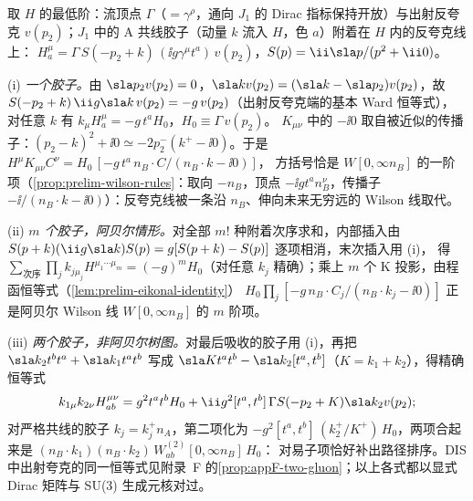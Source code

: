 \begin{example}\label{ex:sudakov-ward-wilson}
取 $H$ 的最低阶：流顶点 $\Gamma$（$=\gamma^\rho$，通向 $J_1$ 的 Dirac 指标保持开放）与出射反夸克 $v(p_2)$；$J_1$ 中的 A 共线胶子（动量 $k$ 流入 $H$，色 $a$）附着在 $H$ 内的反夸克线上：
$H^\mu_a=\Gamma\,S(-p_2+k)\,(\ii g\gamma^\mu t^a)\,v(p_2)$，$S(p)=\ii\sla p/(p^2+\ii0)$。

(i) \emph{一个胶子。}由 $\sla p_2v(p_2)=0$，$\sla kv(p_2)=(\sla k-\sla p_2)v(p_2)$，故 $S(-p_2+k)\,\ii g\sla k\,v(p_2)=-g\,v(p_2)$（出射反夸克端的基本 Ward 恒等式），
对任意 $k$ 有 $k_\mu H^\mu_a=-g\,t^aH_0$，$H_0\equiv\Gamma\,v(p_2)$。%
$K_{\mu\nu}$ 中的 $-\ii0$ 取自被近似的传播子：$(p_2-k)^2+\ii0\simeq-2p_2^-(k^+-\ii0)$。于是 $H^\mu K_{\mu\nu}C^\nu=H_0\,[-g\,t^a\,n_B\!\cdot\!C/(n_B\cdot k-\ii0)]$，
方括号恰是 $W[0,\infty n_B]$ 的一阶项（\cref{prop:prelim-wilson-rules}：取向 $-n_B$，顶点 $-\ii gt^an_B^\nu$，传播子 $-\ii/(n_B\cdot k-\ii0)$）：反夸克线被一条沿 $n_B$、伸向未来无穷远的 Wilson 线取代。

(ii) \emph{$m$ 个胶子，阿贝尔情形。}对全部 $m!$ 种附着次序求和，内部插入由 $S(p+k)(\ii g\sla k)S(p)=g[S(p+k)-S(p)]$ 逐项相消，末次插入用 (i)，
得 $\sum_{\text{次序}}\prod_jk_{j\mu_j}H^{\mu_1\cdots\mu_m}=(-g)^mH_0$（对任意 $k_j$ 精确）；乘上 $m$ 个 K 投影，由程函恒等式（\cref{lem:prelim-eikonal-identity}）
$H_0\prod_j[-g\,n_B\cdot C_j/(n_B\cdot k_j-\ii0)]$ 正是阿贝尔 Wilson 线 $W[0,\infty n_B]$ 的 $m$ 阶项。

(iii) \emph{两个胶子，非阿贝尔树图。}对最后吸收的胶子用 (i)，再把 $\sla k_2t^bt^a+\sla k_1t^at^b$ 写成 $\sla Kt^at^b-\sla k_2[t^a,t^b]$（$K=k_1+k_2$），得精确恒等式
\[
k_{1\mu}k_{2\nu}H^{\mu\nu}_{ab}=g^2t^at^bH_0+\ii g^2[t^a,t^b]\,\Gamma S(-p_2+K)\sla k_2v(p_2);
\]
对严格共线的胶子 $k_j=k_j^+n_A$，第二项化为 $-g^2[t^a,t^b]\,(k_2^+/K^+)\,H_0$，两项合起来是 $(n_B\!\cdot\!k_1)(n_B\!\cdot\!k_2)\,W^{(2)}_{ab}[0,\infty n_B]\,H_0$：
对易子项恰好补出路径排序。DIS 中出射夸克的同一恒等式见附录~F 的\cref{prop:appF-two-gluon}；以上各式都以显式 Dirac 矩阵与 SU(3) 生成元核对过。%
\end{example}

